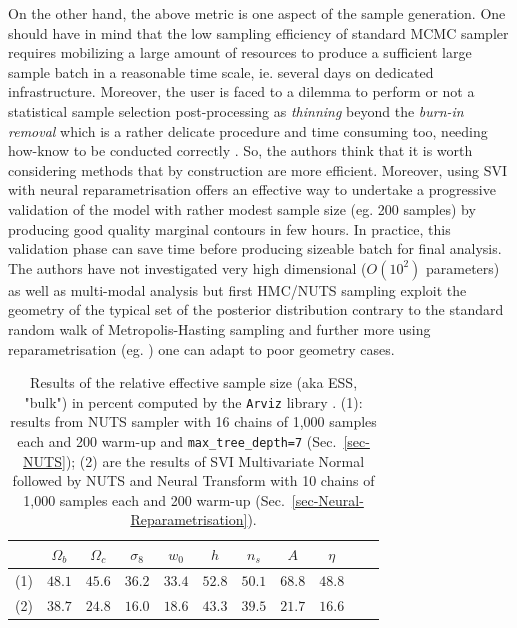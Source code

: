 \documentclass[final,5p,times,twocolumn,authoryear]{elsarticle}
\begin{document}
On the other hand, the above metric is one aspect of the sample generation. One should have in mind that the low sampling efficiency of standard MCMC sampler requires mobilizing a large amount of resources to produce a sufficient large sample batch in a reasonable time scale, ie. several days on dedicated infrastructure. Moreover, the user is faced to a dilemma to perform or not a statistical sample selection post-processing as \textit{thinning} beyond the \textit{burn-in removal} which is a rather delicate procedure and time consuming too, needing how-know to be conducted correctly \citep{doi:10.1146/annurev-statistics-040220-091727, 2015arXiv151007727O}. So, the authors think that it is worth considering methods that by construction are more efficient. Moreover, using SVI with neural reparametrisation offers an effective way to undertake a progressive validation of the model with rather modest sample size (eg. 200 samples) by producing good quality marginal contours in few hours. In practice, this validation phase can save time before producing sizeable batch for final analysis. The authors have not investigated very high dimensional ($O(10^2)$ parameters) as well as multi-modal analysis but first HMC/NUTS sampling exploit the geometry of the typical set of the posterior distribution contrary to the standard random walk of Metropolis-Hasting sampling and further more using reparametrisation (eg. \cite{2019arXiv190303704H}) one can adapt to poor geometry cases.
%
\begin{table}[htb]
\caption{Results of the relative effective sample size (aka ESS, "bulk") in percent computed by the \texttt{Arviz} library \citep{arviz_2019}.
(1): results from NUTS sampler with 16 chains of 1,000 samples each and 200 warm-up and \texttt{max\_tree\_depth=7} (Sec.~\ref{sec-NUTS}); (2) are the results of SVI Multivariate Normal followed by NUTS and Neural Transform  with 10 chains of 1,000 samples each and 200 warm-up (Sec.~\ref{sec-Neural-Reparametrisation}).}
\label{tab-ESS-NUTS_SVI-1}
 \centering
\begin{tabular}{ccccccccccc}
\hline
    & $\Omega_b$ & $\Omega_c$ & $\sigma_8$ & $w_0$ & $h$ & $n_s$ & $A$ & $\eta$\\
\hline
(1) & $48.1$ &  $45.6$     & $36.2$     & $33.4$ & $52.8$ & $50.1$ & $68.8$ & $48.8$\\
(2) & $38.7$ &  $24.8$     & $16.0$     & $18.6$ & $43.3$ & $39.5$ & $21.7$ & $16.6$\\
\hline
\end{tabular}
\end{table}
\end{document}
